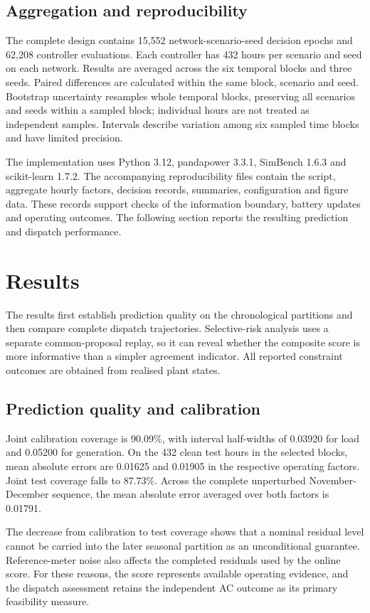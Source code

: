 \documentclass[11pt,a4paper]{article}
\begin{document}
\subsection{Aggregation and reproducibility}
The complete design contains 15,552 network-scenario-seed decision epochs and 62,208 controller evaluations. Each controller has 432 hours per scenario and seed on each network. Results are averaged across the six temporal blocks and three seeds. Paired differences are calculated within the same block, scenario and seed. Bootstrap uncertainty resamples whole temporal blocks, preserving all scenarios and seeds within a sampled block; individual hours are not treated as independent samples. Intervals describe variation among six sampled time blocks and have limited precision.

The implementation uses Python 3.12, pandapower 3.3.1, SimBench 1.6.3 and scikit-learn 1.7.2. The accompanying reproducibility files contain the script, aggregate hourly factors, decision records, summaries, configuration and figure data. These records support checks of the information boundary, battery updates and operating outcomes. The following section reports the resulting prediction and dispatch performance.

\section{Results}\label{sec:results}
The results first establish prediction quality on the chronological partitions and then compare complete dispatch trajectories. Selective-risk analysis uses a separate common-proposal replay, so it can reveal whether the composite score is more informative than a simpler agreement indicator. All reported constraint outcomes are obtained from realised plant states.

\subsection{Prediction quality and calibration}
Joint calibration coverage is 90.09\%, with interval half-widths of 0.03920 for load and 0.05200 for generation. On the 432 clean test hours in the selected blocks, mean absolute errors are 0.01625 and 0.01905 in the respective operating factors. Joint test coverage falls to 87.73\%. Across the complete unperturbed November-December sequence, the mean absolute error averaged over both factors is 0.01791.

The decrease from calibration to test coverage shows that a nominal residual level cannot be carried into the later seasonal partition as an unconditional guarantee. Reference-meter noise also affects the completed residuals used by the online score. For these reasons, the score represents available operating evidence, and the dispatch assessment retains the independent AC outcome as its primary feasibility measure.
\end{document}
